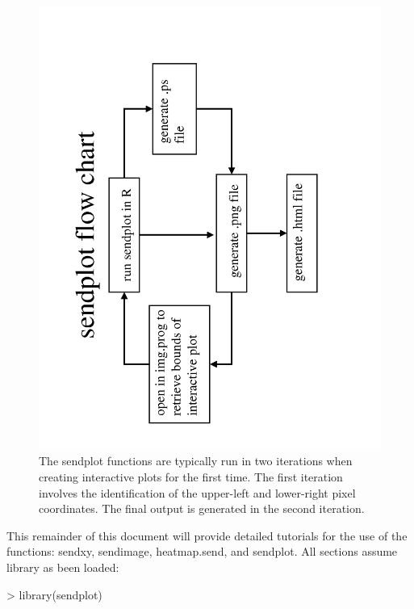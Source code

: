 \documentclass[]{article}
\begin{document}
\begin{center}
\begin{figure}
\includegraphics[angle=270]{sendplotFlowChart}
\caption{The sendplot functions are typically run in two iterations when creating interactive plots for the first time. The first iteration involves the identification of the upper-left and lower-right pixel coordinates. The final output is generated in the second iteration.}
\end{figure}
\end{center}


\indent This remainder of this document will provide detailed tutorials for the use of the functions: sendxy, sendimage, heatmap.send, and sendplot. All sections assume library as been loaded:

\begin{Schunk}
\begin{Sinput}
> library(sendplot)
\end{Sinput}
\end{Schunk}
\end{document}
